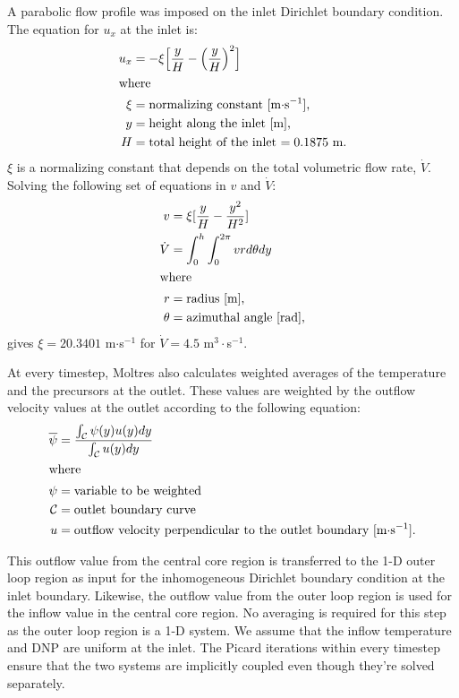 A parabolic flow profile was imposed on the inlet Dirichlet boundary
condition. The equation for $u_x$ at the inlet is:
%
\begin{align}
    u_x &= -\xi \Big[\frac{y}{H} - \Big(\frac{y}{H}\Big)^2 
    \Big] \\
    \intertext{where}
    \xi &= \text{normalizing constant [m$\cdot$s$^{-1}$],} \nonumber \\
    y &= \text{height along the inlet [m],} \nonumber \\
    H &= \text{total height of the inlet $= 0.1875$ m.} \nonumber
\end{align}
%
$\xi$ is a normalizing constant that depends on the total volumetric flow
rate, $\dot{V}$. Solving the following set of equations in $v$ and $\dot{V}$:
%
\begin{align}
    v &= \xi [\frac{y}{H} - \frac{y^2}{H^2}] \\
    \dot{V} &= \int^h_0 \int^{2 \pi}_0 v r d\theta dy \\
    \intertext{where}
    r &= \text{radius [m],} \nonumber \\
    \theta &= \text{azimuthal angle [rad],} \nonumber
\end{align}
%
gives $\xi = 20.3401$ m$\cdot$s$^{-1}$ for $\dot{V} = 4.5$ m$^3\cdot$s$^{-1}$. 

At every timestep, Moltres also calculates weighted averages of the
temperature and the precursors at the outlet. These values are weighted by the
outflow velocity values at the outlet according to the following equation:
%
\begin{align}
    \overline{\psi} &= \frac{\int_\mathcal{C} \psi(y) u(y) dy}{
    \int_\mathcal{C} u(y) dy} \\
    \intertext{where}
    \psi &= \text{variable to be weighted} \nonumber \\
    \mathcal{C} &= \text{outlet boundary curve} \nonumber \\
    u &= \text{outflow velocity perpendicular to the outlet boundary
    [m$\cdot$s$^{-1}$].} \nonumber
\end{align}

This outflow value from the central core region is transferred to the 1-D
outer loop region as input for the inhomogeneous Dirichlet boundary
condition at the inlet boundary. Likewise, the outflow value from the outer
loop region is used for the inflow value in the central core region. No
averaging is required for this step as the outer loop region is a 1-D system.
We assume that the inflow temperature and \gls{DNP} are uniform at the inlet.
The Picard iterations within every timestep ensure that the two systems are
implicitly coupled even though they're solved separately.
